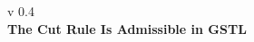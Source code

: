 \documentclass[a4paper, 12pt]{paper}
\begin{document}
{\noindent
	v 0.4 \\
{\large\textbf{The Cut Rule Is Admissible in GSTL}}
}
\\





\end{document}
